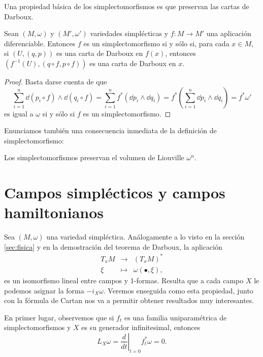 Una propiedad básica de los simplectomorfismos es que preservan las cartas de Darboux.
\begin{prop}
  Sean $(M,\omega)$ y $(M',\omega')$ variedades simplécticas y $f:M \rightarrow M'$ una aplicación diferenciable. Entonces $f$ es un simplectomorfismo si y sólo si, para cada $x \in M$, si $(U,(q,p))$ es una carta de Darboux en $f(x)$, entonces $(f^{-1}(U),(q\circ f, p \circ f))$ es una carta de Darboux en $x$.
\end{prop}
\begin{proof}\leavevmode
Basta darse cuenta de que
\begin{equation*}
  \sum_{i=1}^n \dd (p_i \circ f) \wedge \dd (q_i \circ f) = \sum_{i=1}^n f^* (\dd p_i \wedge \dd q_i) = f^* \left( \sum_{i=1}^n \dd p_i \wedge \dd q_i \right) = f^* \omega'
\end{equation*}
es igual a $\omega$ si y sólo si $f$ es un simplectomorfismo.

\end{proof}

Enunciamos también una consecuencia inmediata de la definición de simplectomorfismo:
\begin{prop}\label{volumen}
  Los simplectomorfismos preservan el volumen de Liouville $\omega^n$.
\end{prop}

\section{Campos simplécticos y campos hamiltonianos}\label{sec:hamilton}
Sea $(M,\omega)$ una variedad simpléctica. Análogamente a lo visto en la sección \ref{sec:fisica} y en la demostración del teorema de Darboux, la aplicación 
  \begin{equation*}
    \begin{array}{rcl}
      T_xM & \longrightarrow & (T_xM)^* \\
      \xi & \longmapsto & \omega(\bullet,\xi),
      \end{array} 
  \end{equation*}
es un isomorfismo lineal entre campos y 1-formas. Resulta que a cada campo $X$ le podemos asignar la forma $-i_X \omega$. Veremos enseguida como esta propiedad, junto con la fórmula de Cartan nos va a permitir obtener resultados muy interesantes.

En primer lugar, observemos que si $f_t$ es una familia uniparamétrica de simplectomorfismos y $X$ es su generador infinitesimal, entonces
\begin{equation*}
  L_{X}\omega=\left.\frac{d}{dt}\right|_{t=0}f_t^*\omega=0.	
\end{equation*}

